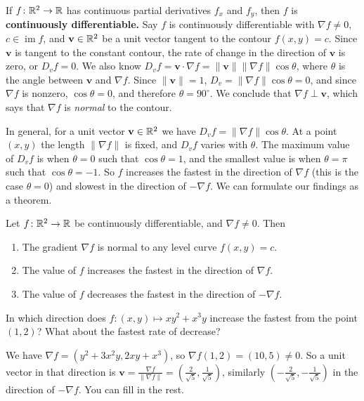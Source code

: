 If $f\colon \mathbb{R}^2 \to \mathbb{R}$ has continuous partial derivatives $f_x$ and $f_y$, then $f$ is \textbf{continuously differentiable.} Say $f$ is continuously differentiable with $\nabla f\neq 0$, $c\in \operatorname{im}f$, and $\mathbf v\in \mathbb{R}^2$ be a unit vector tangent to the contour $f(x,y)=c$. Since $\mathbf v$ is tangent to the constant contour, the rate of change in the direction of $\mathbf v$ is zero, or $D_vf=0$. We also know $D_vf=\mathbf v\cdot \nabla f=\|\mathbf v\|\|\nabla f\|\cos\theta$, where $\theta$ is the angle between $\mathbf v$ and $\nabla f$. Since $\|\mathbf v\|=1$, $D_v=\|\nabla f\|\cos\theta=0$, and since $\nabla f$ is nonzero, $\cos \theta=0$, and therefore $\theta=90^{\circ }$. We conclude that $\nabla f \perp \mathbf v$, which says that $\nabla f$ is \emph{normal} to the contour. 

In general, for a unit vector $\mathbf v\in \mathbb{R}^2$ we have $D_vf=\|\nabla f\|\cos\theta$. At a point $(x,y)$ the length $\|\nabla f\|$ is fixed, and $D_vf$ varies with $\theta$. The maximum value of $D_vf$ is when $\theta=0$ such that $\cos\theta=1$, and the smallest value is when $\theta=\pi$ such that $\cos\theta=-1$. So $f$ increases the fastest in the direction of $\nabla f$ (this is the case $\theta=0$) and slowest in the direction of $-\nabla f$. We can formulate our findings as a theorem.
\begin{theorem}
    Let $f \colon \mathbb{R}^2 \to \mathbb{R}$ be continuously differentiable, and $\nabla f \neq 0$. Then
    \begin{enumerate}[label=(\alph*)]
        \item The gradient $\nabla f$ is normal to any level curve $f(x,y)=c$.
        \item The value of $f$ increases the fastest in the direction of  $\nabla f$.
        \item The value of $f$ decreases the fastest in the direction of $-\nabla f$.
    \end{enumerate}
\end{theorem}
\begin{example}
    In which direction does $f \colon (x,y) \mapsto  xy^2+x^3y$ increase the fastest from the point $(1,2)$? What about the fastest rate of decrease?
\end{example}
\begin{solution}
    We have $\nabla f=(y^2+3x^2y,2xy+x^3)$, so $\nabla f (1,2)=(10,5)\neq 0$. So a unit vector in that direction is $\mathbf v= \frac{\nabla f}{\|\nabla f\|}=\left( \frac{2}{\sqrt{5} },\frac{1}{\sqrt{5} } \right) $, similarly $\left( -\frac{2}{\sqrt{5} },-\frac{1}{\sqrt{5} } \right) $ in the direction of $-\nabla f$. You can fill in the rest.
\end{solution}
